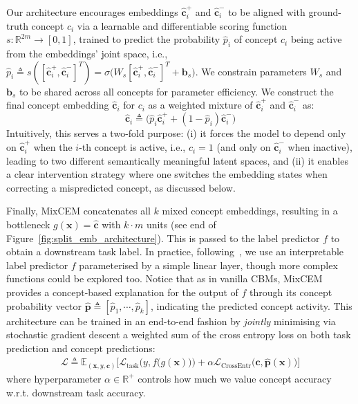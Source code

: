 Our architecture encourages embeddings $\hat{\mathbf{c}}^+_i$ and $\hat{\mathbf{c}}^-_i$ to be aligned with ground-truth concept $c_i$ via a learnable and differentiable scoring function $s: \mathbb{R}^{2 m} \rightarrow [0, 1]$, trained to predict the probability $\hat{p}_i$ of concept $c_i$ being active from the embeddings' joint space, i.e., $\hat{p}_i \triangleq s([\hat{\mathbf{c}}^+_i, \hat{\mathbf{c}}^-_i]^T) =  \sigma\big(W_s[\hat{\mathbf{c}}^+_i, \hat{\mathbf{c}}^-_i]^T + \mathbf{b}_s\big)$. We constrain parameters $W_s$ and $\mathbf{b}_s$ to be shared across all concepts for parameter efficiency.
We construct the final concept embedding $\hat{\mathbf{c}}_i$ for $c_i$ as a weighted mixture of $\hat{\mathbf{c}}^+_i$ and $\hat{\mathbf{c}}^-_i$ as:
\[
\hat{\mathbf{c}}_i \triangleq \big(\hat{p}_i \hat{\mathbf{c}}^+_i + (1 - \hat{p}_i) \hat{\mathbf{c}}^-_i \big)
\]
Intuitively, this serves a two-fold purpose: (i) it forces the model to depend only on $\hat{\mathbf{c}}^+_i$ when the $i$-th concept is active, i.e., $c_i = 1$ (and only on $\hat{\mathbf{c}}^-_i$ when inactive), leading to two different semantically meaningful latent spaces, and (ii) it enables a clear intervention strategy where one switches the embedding states when correcting a mispredicted concept, as discussed below.

Finally, MixCEM concatenates all $k$ mixed concept embeddings, resulting in a bottleneck $g(\mathbf{x}) = \hat{\textbf{c}}$ with $k\cdot m$ units (see end of Figure~\ref{fig:split_emb_architecture}). This is passed to the label predictor $f$ to obtain a downstream task label. In practice, following~\citet{koh2020concept}, we use an interpretable label predictor $f$ parameterised by a simple linear layer, though more complex functions could be explored too. Notice that as in vanilla CBMs, MixCEM provides a concept-based explanation for the output of $f$ through its concept probability vector $\hat{\mathbf{p}} \triangleq [\hat{p}_1, \cdots, \hat{p}_k ]$, indicating the predicted concept activity. This architecture can be trained in an end-to-end fashion by \textit{jointly} minimising via stochastic gradient descent a weighted sum of the cross entropy loss on both task prediction and concept predictions:
\begin{align}
    \mathcal{L} \triangleq \mathbb{E}_{(\mathbf{x}, y, \mathbf{c})}\Big[ \mathcal{L}_\text{task}\Big(y, f\big(g(\mathbf{x})\big)\Big) + \alpha \mathcal{L}_\text{CrossEntr}\Big(\mathbf{c}, \hat{\mathbf{p}}(\mathbf{x})\Big) \Big]
\end{align}
where hyperparameter $\alpha \in \mathbb{R}^+$ controls how much we value concept accuracy w.r.t. downstream task accuracy. 


